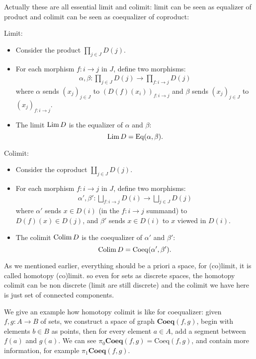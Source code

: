 \begin{remark}
  Actually these are all essential limit and colimit: limit can be seen as equalizer of product and colimit can be seen as coequalizer of coproduct:

  Limit:
\begin{itemize}
    \item Consider the product $\prod_{j \in J} D(j)$.
    \item For each morphism $f : i \to j$ in $J$, define two morphisms:
    \begin{align*}
        \alpha, \beta : \prod_{j \in J} D(j) \to \prod_{f : i \to j} D(j)
    \end{align*}
    where $\alpha$ sends $(x_j)_{j \in J}$ to $(D(f)(x_i))_{f : i \to j}$ and $\beta$ sends $(x_j)_{j \in J}$ to $(x_j)_{f : i \to j}$.
    \item The limit $\operatorname*{\mathrm{Lim}} D$ is the equalizer of $\alpha$ and $\beta$:
    \[
    \operatorname*{\mathrm{Lim}} D = \mathrm{Eq}(\alpha, \beta).
    \]
\end{itemize}
Colimit:
\begin{itemize}
    \item Consider the coproduct $\coprod_{j \in J} D(j)$.
    \item For each morphism $f : i \to j$ in $J$, define two morphisms:
    \begin{align*}
        \alpha', \beta' : \bigsqcup_{f : i \to j} D(i) \to \bigsqcup_{j \in J} D(j)
    \end{align*}
    where $\alpha'$ sends $x \in D(i)$ (in the $f : i \to j$ summand) to $D(f)(x) \in D(j)$, and $\beta'$ sends $x \in D(i)$ to $x$ viewed in $D(i)$.
    \item The colimit $\operatorname*{\mathrm{Colim}} D$ is the coequalizer of $\alpha'$ and $\beta'$:
    \[
    \operatorname*{\mathrm{Colim}} D = \mathrm{Coeq}(\alpha', \beta').
    \]
\end{itemize}
\end{remark}

\begin{remark}
  As we mentioned earlier, everything should be a priori a space, for (co)limit, it is called homotopy (co)limit. so even for sets as discrete spaces, the homotopy colimit can be non discrete (limit are still discrete) and the colimit we have here is just set of connected components.
  
  We give an example how homotopy colimit is like for coequalizer: given $f,g:A\to B$ of sets, we construct a space of graph $\mathbf{Coeq}(f,g)$, begin with elements $b \in B $ as points, then for every element $a\in A$, add a segment between $f(a)$ and $g(a)$. We can see $ \pi_0\mathbf{Coeq}(f,g)=\mathrm{Coeq}(f,g)$, and contain more information, for example $\pi_1\mathbf{Coeq}(f,g)$.
\end{remark}

